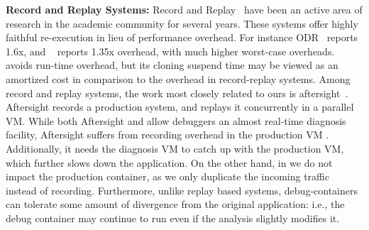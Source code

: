 \textbf{Record and Replay Systems:}  
Record and Replay~\cite{odr,revirt,guo2008r2, geels2007friday} have been an active area of research in the academic community for several years. 
These systems offer highly faithful re-execution in lieu of performance overhead. 
For instance ODR~\cite{odr} reports 1.6x, and ~\cite{aftersight} reports 1.35x overhead, with much higher worst-case overheads.
\parikshan avoids run-time overhead, but its cloning suspend time may be viewed as an amortized cost in comparison to the overhead in record-replay systems.
Among record and replay systems, the work most closely related to ours is aftersight~\cite{aftersight}. 
Aftersight records a production system, and replays it concurrently in a parallel VM.
While both Aftersight and \parikshan allow debuggers an almost real-time diagnosis facility, Aftersight suffers from recording overhead in the production VM .
Additionally, it needs the diagnosis VM to catch up with the production VM, which further slows down the application.
On the other hand, in \parikshan we do not impact the production container, as we only duplicate the incoming traffic instead of recording.
Furthermore, unlike replay based systems, \parikshan debug-containers can tolerate some amount of divergence from the original application: i.e., the debug container may continue to run even if the analysis slightly modifies it.
  
\iffalse
\textbf{Distributed System Debugging:}
Production systems oftem employ light weight instrumentation tools~\cite{magpie,clue,vpath} to capture traces like system calls, transaction or event traces.
Some of these like VPath~\cite{vpath} use end-to-end trace event stitching to capture flows across multiple tiers to infer performance bugs.
While the instrumentation for these tools have a low overhead, the corresponding granularity of the logs is also less.
This limits the diagnosis capability of these tools, and they are only able to give a hint towards the bug root-cause rather than debug it completely.
\fi

